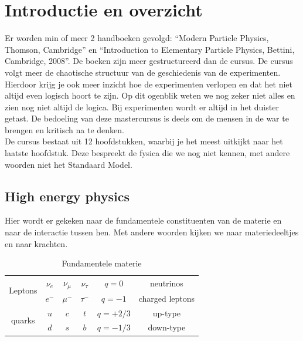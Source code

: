 \documentclass[../main.tex]{subfiles}
\begin{document}
\section{Introductie en overzicht}%
\label{sec:introductie_en_overzicht}

Er worden min of meer 2 handboeken gevolgd: ``Modern Particle Physics, Thomson, Cambridge'' en ``Introduction to Elementary Particle Physics,  Bettini, Cambridge, 2008''. De boeken zijn meer gestructureerd dan de cursus. De cursus volgt meer de chaotische structuur van de geschiedenis van de experimenten. Hierdoor krijg je ook meer inzicht hoe de experimenten verlopen en dat het niet altijd even logisch hoort te zijn. Op dit ogenblik weten we nog zeker niet alles en zien nog niet altijd de logica. Bij experimenten wordt er altijd in het duister getast. De bedoeling van deze mastercursus is deels om de mensen in de war te brengen en kritisch na te denken.\\
De cursus bestaat uit 12 hoofdstukken, waarbij je het meest uitkijkt naar het laatste hoofdstuk. Deze bespreekt de fysica die we nog niet kennen, met andere woorden niet het Standaard Model.

\subsection{High energy physics}%
\label{sub:high_energy_physics}
Hier wordt er gekeken naar de fundamentele constituenten van de materie en naar de interactie tussen hen. Met andere woorden kijken we naar materiedeeltjes en naar krachten.

\begin{table}[h]
    \centering
    \caption{Fundamentele materie}
    \label{tab:fund_mat}
    \begin{tabular}{cc|c|ccc}
        \multicolumn{1}{c}{\multirow{2}{*}{Leptons}} & $\nu_e$ & $\nu_\mu$ & $\nu_\tau$ & $q=0$ & neutrinos \\
        \multicolumn{1}{c}{}                         & $e^-$ & $\mu^-$ & $\tau^-$ & $q=-1$ & charged leptons \\ \hline
        \multirow{2}{*}{quarks}                      & $u$ & $c$ & $t$ & $q=+2/3$ & up-type \\
                                                     & $d$ & $s$ & $b$ & $q=-1/3$ & down-type
    \end{tabular}
\end{table}
\end{document}
